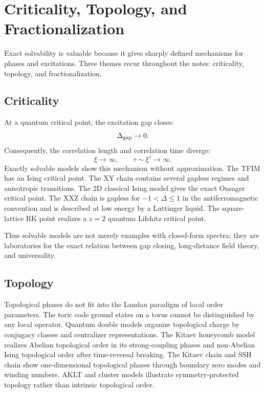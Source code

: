 \section{Criticality, Topology, and Fractionalization}
\label{sec:criticality-topology-fractionalization}

Exact solvability is valuable because it gives sharply defined mechanisms for phases and excitations.  Three themes recur throughout the notes: criticality, topology, and fractionalization.

\subsection{Criticality}

At a quantum critical point, the excitation gap closes:
\begin{equation}
\label{eq:conclusion-gap-closes}
    \Delta_{\rm gap}\to0.
\end{equation}
Consequently, the correlation length and correlation time diverge:
\begin{equation}
\label{eq:conclusion-critical-divergence}
    \xi\to\infty,
    \qquad
    \tau\sim \xi^z\to\infty.
\end{equation}
Exactly solvable models show this mechanism without approximation.  The TFIM has an Ising critical point.  The XY chain contains several gapless regimes and anisotropic transitions.  The 2D classical Ising model gives the exact Onsager critical point.  The XXZ chain is gapless for \(-1<\Delta\leq1\) in the antiferromagnetic convention and is described at low energy by a Luttinger liquid.  The square-lattice RK point realizes a \(z=2\) quantum Lifshitz critical point.

Thus solvable models are not merely examples with closed-form spectra; they are laboratories for the exact relation between gap closing, long-distance field theory, and universality.

\subsection{Topology}

Topological phases do not fit into the Landau paradigm of local order parameters.  The toric code ground states on a torus cannot be distinguished by any local operator.  Quantum double models organize topological charge by conjugacy classes and centralizer representations.  The Kitaev honeycomb model realizes Abelian topological order in its strong-coupling phases and non-Abelian Ising topological order after time-reversal breaking.  The Kitaev chain and SSH chain show one-dimensional topological phases through boundary zero modes and winding numbers.  AKLT and cluster models illustrate symmetry-protected topology rather than intrinsic topological order.

